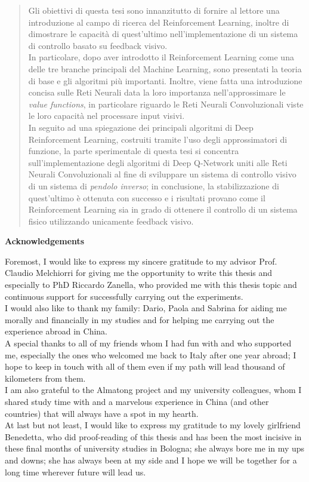 \documentclass[a4paper, 12pt]{report}
\makeatletter
\newcommand\ackname{Acknowledgements}
\newenvironment{acknowledgements}{%
	\titlepage
	\null\vfil
	\@beginparpenalty\@lowpenalty
	\begin{center}%
		\bfseries \Large \ackname
		\@endparpenalty\@M
\end{center}}%
{\par\vfil\null\endtitlepage}
\newenvironment{acknowledgements}{%
	\if@twocolumn
	\section*{\abstractname}%
	\else
	\small
	\begin{center}%
		{\bfseries \Large \ackname\vspace{-.5em}\vspace{\z@}}%
	\end{center}%
	\quotation
	\fi}
{\if@twocolumn\else\endquotation\fi}
\makeatother
\begin{document}
\begin{abstract}
	Gli obiettivi di questa tesi sono innanzitutto di fornire al lettore una introduzione al campo di ricerca del Reinforcement Learning, inoltre di dimostrare le capacità di quest'ultimo nell'implementazione di un sistema di controllo basato su feedback visivo. 
	\\
	\indent In particolare, dopo aver introdotto il Reinforcement Learning come una delle tre branche principali del Machine Learning, sono presentati la teoria di base e gli algoritmi più importanti. Inoltre, viene fatta una introduzione concisa sulle Reti Neurali data la loro importanza nell'approssimare le \textit{value functions}, in particolare riguardo le Reti Neurali Convoluzionali viste le loro capacità nel processare input visivi.	
	\\
	\indent	In seguito ad una spiegazione dei principali algoritmi di Deep Reinforcement Learning, costruiti tramite l'uso degli approssimatori di funzione, la parte sperimentale di questa tesi si concentra sull'implementazione degli algoritmi di Deep Q-Network uniti alle Reti Neurali Convoluzionali al fine di sviluppare un sistema di controllo visivo di un sistema di \textit{pendolo inverso}; in conclusione, la stabilizzazione di quest'ultimo è ottenuta con successo e i risultati provano come il Reinforcement Learning sia in grado di ottenere il controllo di un sistema fisico utilizzando unicamente feedback visivo.
\end{abstract}

\clearpage


\begin{acknowledgements}
	Foremost, I would like to express my sincere gratitude to my advisor Prof. Claudio Melchiorri for giving me the opportunity to write this thesis and especially to PhD Riccardo Zanella, who provided me with this thesis topic and continuous support for successfully carrying out the experiments.
	\\
	\indent I would also like to thank my family: Dario, Paola and Sabrina for aiding me morally and financially in my studies and for helping me carrying out the experience abroad in China.
	\\
	\indent A special thanks to all of my friends whom I had fun with and who supported me, especially the ones who welcomed me back to Italy after one year abroad; I hope to keep in touch with all of them even if my path will lead thousand of kilometers from them. 
	\\
	\indent
	I am also grateful to the Almatong project and my university colleagues, whom I shared study time with and a marvelous experience in China (and other countries) that will always have a spot in my hearth.
	\\
	\indent At last but not least, I would like to express my gratitude to my lovely girlfriend Benedetta, who did proof-reading of this thesis and has been the most incisive in these final months of university studies in Bologna; she always bore me in my ups and downs; she has always been at my side and I hope we will be together for a long time wherever future will lead us.
\end{acknowledgements}
\end{document}

